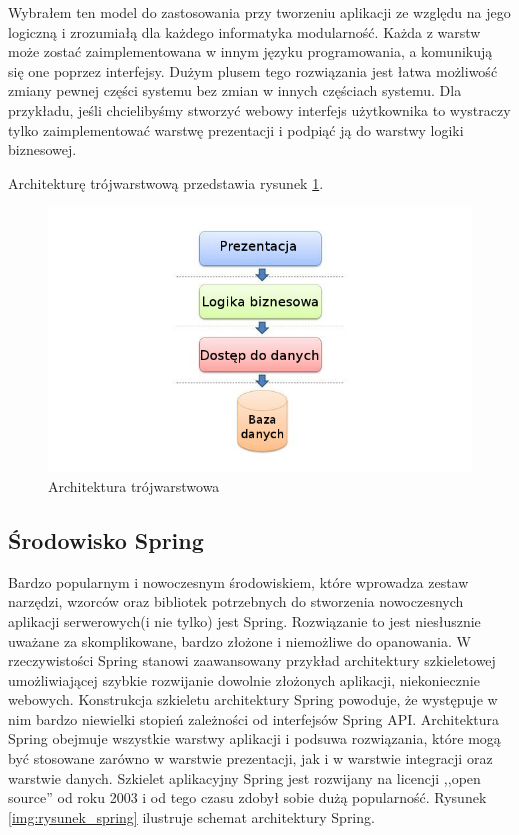 Wybrałem ten model do zastosowania przy tworzeniu aplikacji ze względu na jego logiczną i zrozumiałą dla każdego informatyka modularność. Każda z warstw może zostać zaimplementowana w innym języku programowania, a komunikują się one poprzez interfejsy. Dużym plusem tego rozwiązania jest łatwa możliwość zmiany pewnej części systemu bez zmian w innych częściach systemu. Dla przykładu, jeśli chcielibyśmy stworzyć webowy interfejs użytkownika to wystraczy tylko zaimplementować warstwę prezentacji i podpiąć ją do warstwy logiki biznesowej.

Architekturę trójwarstwową przedstawia rysunek \ref{img:rysunek_3layer}.
\begin{figure}[!ht]
\label{img:rysunek_3layer}	
\includegraphics[scale=0.5]{images/3layer-architect}
\caption[Rysunek przedstawiający model architektury trójwarstwowej]{Architektura trójwarstwowa}
\end{figure}

\subsection{Środowisko Spring}
\label{sec:modelArchitekturySpring}
Bardzo popularnym i nowoczesnym środowiskiem, które wprowadza zestaw narzędzi, wzorców oraz bibliotek potrzebnych do stworzenia nowoczesnych aplikacji serwerowych(i nie tylko) jest Spring. Rozwiązanie to jest niesłusznie uważane za skomplikowane, bardzo złożone i niemożliwe do opanowania. W rzeczywistości Spring stanowi zaawansowany przykład architektury szkieletowej umożliwiającej szybkie rozwijanie dowolnie złożonych aplikacji, niekoniecznie webowych. Konstrukcja szkieletu architektury Spring powoduje, że występuje w nim bardzo niewielki stopień zależności od interfejsów Spring API. Architektura Spring obejmuje wszystkie warstwy aplikacji i podsuwa rozwiązania, które mogą być stosowane zarówno w warstwie prezentacji, jak i w warstwie integracji oraz warstwie danych. Szkielet aplikacyjny Spring jest rozwijany na licencji ,,open source'' od roku 2003 i od tego czasu zdobył sobie dużą popularność. Rysunek \ref{img:rysunek_spring} ilustruje schemat architektury Spring.

